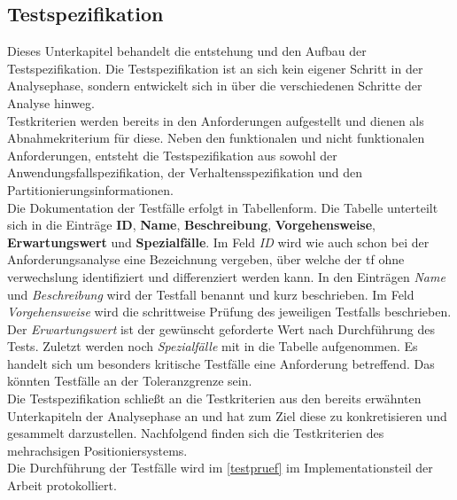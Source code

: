 \documentclass[../../../Bachelorarbeit.tex]{subfiles}
\begin{document}
\subsection{Testspezifikation} \label{testspez}
Dieses Unterkapitel behandelt die entstehung und den Aufbau der Testspezifikation. Die Testspezifikation ist an sich kein eigener Schritt in der Analysephase, sondern entwickelt sich in über die verschiedenen Schritte der Analyse hinweg.\\
Testkriterien werden bereits in den Anforderungen aufgestellt und dienen als Abnahmekriterium für diese. Neben den funktionalen und nicht funktionalen Anforderungen, entsteht die Testspezifikation aus sowohl der Anwendungsfallspezifikation, der Verhaltensspezifikation und den Partitionierungsinformationen.\\
Die Dokumentation der Testfälle erfolgt in Tabellenform. Die Tabelle unterteilt sich in die Einträge \textbf{ID}, \textbf{Name}, \textbf{Beschreibung}, \textbf{Vorgehensweise}, \textbf{Erwartungswert} und \textbf{Spezialfälle}. Im Feld \textit{ID} wird wie auch schon bei der Anforderungsanalyse eine Bezeichnung vergeben, über welche der \ac{tf} ohne verwechslung identifiziert und differenziert werden kann. In den Einträgen \textit{Name} und \textit{Beschreibung} wird der Testfall benannt und kurz beschrieben. Im Feld \textit{Vorgehensweise} wird die schrittweise Prüfung des jeweiligen Testfalls beschrieben. Der \textit{Erwartungswert} ist der gewünscht \bzw geforderte Wert nach Durchführung des Tests. Zuletzt werden noch \textit{Spezialfälle} mit in die Tabelle aufgenommen. Es handelt sich um besonders kritische Testfälle eine Anforderung betreffend. Das könnten \zB Testfälle an der Toleranzgrenze sein.\\
Die Testspezifikation schließt an die Testkriterien aus den bereits erwähnten Unterkapiteln der Analysephase an und hat zum Ziel diese zu konkretisieren und gesammelt darzustellen. Nachfolgend finden sich die Testkriterien des mehrachsigen Positioniersystems.\\ %
Die Durchführung der Testfälle wird im \autoref{testpruef} im Implementationsteil der Arbeit protokolliert.
\clearpage
\end{document}
